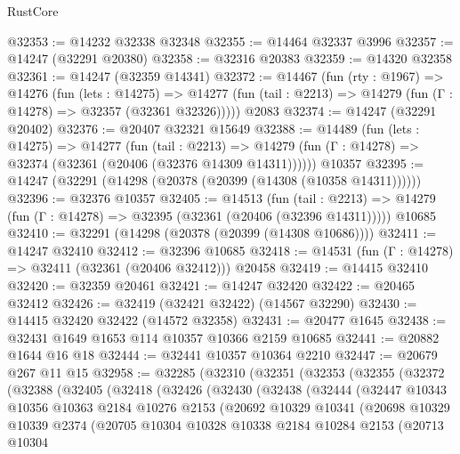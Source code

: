 \begin{lexlean}{RustCore}
\begin{coremodule}
@32353 := @14232 @32338 @32348
@32355 := @14464 @32337 @3996
@32357 := @14247 (@32291 @20380)
@32358 := @32316 @20383
@32359 := @14320 @32358
@32361 := @14247 (@32359 @14341)
@32372 := @14467
    (fun (rty : @1967) =>
    @14276
      (fun (lets : @14275) =>
      @14277 (fun (tail : @2213) => @14279 (fun (Γ : @14278) => @32357 (@32361 @32326)))))
    @2083
@32374 := @14247 (@32291 @20402)
@32376 := @20407 @32321 @15649
@32388 := @14489
    (fun (lets : @14275) =>
    @14277
      (fun (tail : @2213) =>
      @14279 (fun (Γ : @14278) => @32374 (@32361 (@20406 (@32376 @14309 @14311))))))
    @10357
@32395 := @14247 (@32291 (@14298 (@20378 (@20399 (@14308 (@10358 @14311))))))
@32396 := @32376 @10357
@32405 := @14513
    (fun (tail : @2213) => @14279 (fun (Γ : @14278) => @32395 (@32361 (@20406 (@32396 @14311)))))
    @10685
@32410 := @32291 (@14298 (@20378 (@20399 (@14308 @10686))))
@32411 := @14247 @32410
@32412 := @32396 @10685
@32418 := @14531 (fun (Γ : @14278) => @32411 (@32361 (@20406 @32412))) @20458
@32419 := @14415 @32410
@32420 := @32359 @20461
@32421 := @14247 @32420
@32422 := @20465 @32412
@32426 := @32419 (@32421 @32422) (@14567 @32290)
@32430 := @14415 @32420 @32422 (@14572 @32358)
@32431 := @20477 @1645
@32438 := @32431 @1649 @1653 @114 @10357 @10366 @2159 @10685
@32441 := @20882 @1644 @16 @18
@32444 := @32441 @10357 @10364 @2210
@32447 := @20679 @267 @11 @15
@32958 := @32285
    (@32310
      (@32351
        (@32353
          (@32355
            (@32372
              (@32388
                (@32405
                  (@32418
                    (@32426
                      (@32430
                        (@32438
                          (@32444
                            (@32447
                              @10343
                              @10356
                              @10363
                              @2184
                              @10276
                              @2153
                              (@20692
                                @10329
                                @10341
                                (@20698
                                  @10329
                                  @10339
                                  @2374
                                  (@20705
                                    @10304
                                    @10328
                                    @10338
                                    @2184
                                    @10284
                                    @2153
                                    (@20713
                                      @10304

\end{coremodule}
\end{lexlean}
